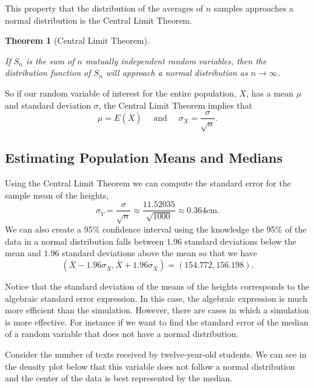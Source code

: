 \documentclass[
]{book}
\newtheorem{theorem}{Theorem}[chapter]
\theoremstyle{definition}
\theoremstyle{definition}
\theoremstyle{definition}
\theoremstyle{definition}
\theoremstyle{remark}
\begin{document}
This property that the distribution of the averages of \(n\) samples approaches a normal distribution is the Central Limit Theorem.

\begin{theorem}[Central Limit Theorem]
\protect\hypertarget{thm:unlabeled-div-315}{}\label{thm:unlabeled-div-315}

If \(S_n\) is the sum of \(n\) mutually independent random variables, then the distribution function of \(S_n\) will approach a normal distribution as \(n\rightarrow \infty\).

\end{theorem}

So if our random variable of interest for the entire population, \(X\), has a mean \(\mu\) and standard deviation \(\sigma\), the Central Limit Theorem implies that
\[\mu = E(\overline{X}) \quad \mbox{ and } \quad \sigma_{\overline{X}}= \frac{\sigma}{\sqrt{n}}.\]

\hypertarget{estimating-population-means-and-medians}{%
\subsection{Estimating Population Means and Medians}\label{estimating-population-means-and-medians}}

Using the Central Limit Theorem we can compute the standard error for the sample mean of the heights,
\[ \sigma_{\overline{Y}} = \frac{\sigma}{\sqrt{n}} \approx \frac{11.52035}{\sqrt{1000}} \approx 0.364 \mbox{cm}.\]
We can also create a 95\% confidence interval using the knowledge the 95\% of the data in a normal distribution falls between \(1.96\) standard deviations below the mean and \(1.96\) standard deviations above the mean so that we have
\[( \overline{X} - 1.96 \sigma_{\overline{X}}, \overline{X} + 1.96 \sigma_{\overline{X}}) = (154.772, 156.198) .\]

Notice that the standard deviation of the means of the heights corresponds to the algebraic standard error expression. In this case, the algebraic expression is much more efficient than the simulation. However, there are cases in which a simulation is more effective. For instance if we want to find the standard error of the median of a random variable that does not have a normal distribution.

Consider the number of texts received by twelve-year-old students. We can see in the density plot below that this variable does not follow a normal distribution and the center of the data is best represented by the median.
\end{document}

